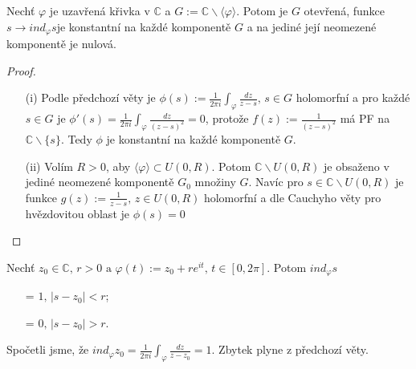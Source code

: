 \begin{theorem}
 Nechť $\varphi$ je uzavřená křivka v $\mathbb{C}$ a $G:=\mathbb{C}\backslash\langle\varphi\rangle$. %
Potom je $G$ otevřená, funkce $s\rightarrow ind_{\varphi} s$je konstantní na každé komponentě $G$ a na jediné její neomezené komponentě je nulová. 
\end{theorem}
\begin{proof}
\begin{itemize}
    \item[(i)] Podle předchozí věty je $\phi(s):=\frac{1}{2\pi i}\int_{\varphi}\frac{dz}{z-s}\text{, }s\in G$  %
    holomorfní a pro každé $s\in G$ je $\phi'(s)=\frac{1}{2\pi i}\int_{\varphi}\frac{dz}{(z-s)^2}=0$, protože $f(z):=\frac{1}{(z-s)^2}$ má PF na $\mathbb{C}\backslash\{s\}$. %
    Tedy $\phi$ je konstantní na každé komponentě $G$.
    \item[(ii)]%
    Volím $R>0$, aby $\langle\varphi\rangle\subset U(0,R)$. Potom $\mathbb{C}\backslash U(0,R)$ je obsaženo v jediné neomezené komponentě $G_{0}$ množiny $G$. Navíc pro $s\in\mathbb{C}\backslash U(0,R)$ je funkce $g(z):=\frac{1}{z-s}\text{, }z\in U(0,R)$ holomorfní a dle Cauchyho věty pro hvězdovitou oblast %
    je $\phi(s)=0$
\end{itemize}

\end{proof}

\begin{example}
Nechť $z_{0}\in\mathbb{C}\text{, }r>0\text{ a }\varphi(t):=z_{0}+r e^{it}\text{, }t\in [0,2\pi]$. %
Potom $ind_{\varphi}s$
\begin{itemize}
    \item[=]$1\text{, }|s-z_{0}|<r$;%
    \item[=] $0\text{, }|s-z_{0}|>r$.%
\end{itemize}
Spočetli jsme, že
$ind_{\varphi}z_{0}=\frac{1}{2\pi i}\int_{\varphi}\frac{dz}{z-z_{0}}=1$.
Zbytek plyne z předchozí věty.
\end{example}